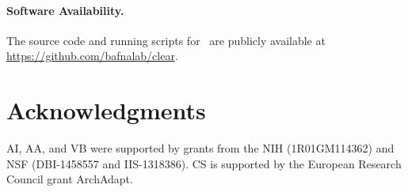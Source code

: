\paragraph{Software Availability.}
The source code and running scripts for \comale\ are publicly available at \\
\href{https://github.com/bafnalab/clear}{https://github.com/bafnalab/clear}.

\section*{Acknowledgments}
AI, AA, and VB were supported by grants from the NIH (1R01GM114362) and
NSF (DBI-1458557 and IIS-1318386). CS is supported by the European Research 
Council grant ArchAdapt.
